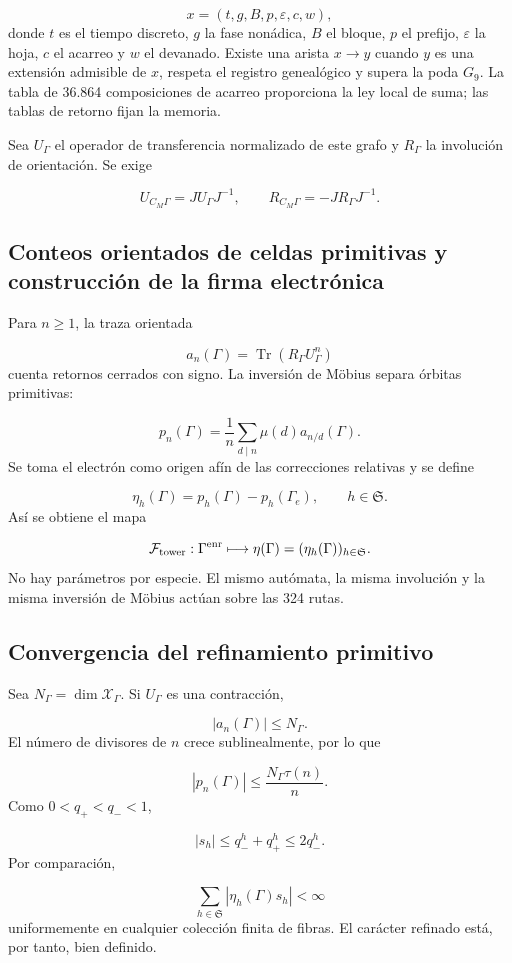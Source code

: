\[
 x=(t,g,B,p,\varepsilon,c,w),
\]
donde \(t\) es el tiempo discreto, \(g\) la fase nonádica, \(B\) el bloque, \(p\) el prefijo, \(\varepsilon\) la hoja, \(c\) el acarreo y \(w\) el devanado. Existe una arista \(x\to y\) cuando \(y\) es una extensión admisible de \(x\), respeta el registro genealógico y supera la poda \(G_9\). La tabla de 36.864 composiciones de acarreo proporciona la ley local de suma; las tablas de retorno fijan la memoria.

Sea \(U_\Gamma\) el operador de transferencia normalizado de este grafo y \(R_\Gamma\) la involución de orientación. Se exige

\[
 U_{C_M\Gamma}=J U_\Gamma J^{-1},\qquad
 R_{C_M\Gamma}=-J R_\Gamma J^{-1}.
\]
\subsection{Conteos orientados de celdas primitivas y construcción de la firma electrónica}
Para \(n\ge1\), la traza orientada

\[
 a_n(\Gamma)=\operatorname{Tr}(R_\Gamma U_\Gamma^n)
\]
cuenta retornos cerrados con signo. La inversión de Möbius separa órbitas primitivas:

\[
 p_n(\Gamma)
 =\frac1n\sum_{d\mid n}\mu(d)a_{n/d}(\Gamma).
\]
Se toma el electrón como origen afín de las correcciones relativas y se define

\[
 \boxed{
 \eta_h(\Gamma)=p_h(\Gamma)-p_h(\Gamma_e),
 \qquad h\in\mathfrak S.}
\]
Así se obtiene el mapa

\[
 \mathcal F_{\rm tower}:
 \Gamma^{\rm enr}\longmapsto
 \eta(\Gamma)=(\eta_h(\Gamma))_{h\in\mathfrak S}.
\]
No hay parámetros por especie. El mismo autómata, la misma involución y la misma inversión de Möbius actúan sobre las 324 rutas.

\subsection{Convergencia del refinamiento primitivo}
Sea \(N_\Gamma=\dim\mathscr X_\Gamma\). Si \(U_\Gamma\) es una contracción,

\[
 |a_n(\Gamma)|\le N_\Gamma.
\]
El número de divisores de \(n\) crece sublinealmente, por lo que

\[
 |p_n(\Gamma)|
 \le\frac{N_\Gamma\tau(n)}n.
\]
Como \(0<q_+<q_-<1\),

\[
 |s_h|\le q_-^h+q_+^h\le2q_-^h.
\]
Por comparación,

\[
 \sum_{h\in\mathfrak S}|\eta_h(\Gamma)s_h|<\infty
\]
uniformemente en cualquier colección finita de fibras. El carácter refinado está, por tanto, bien definido.

